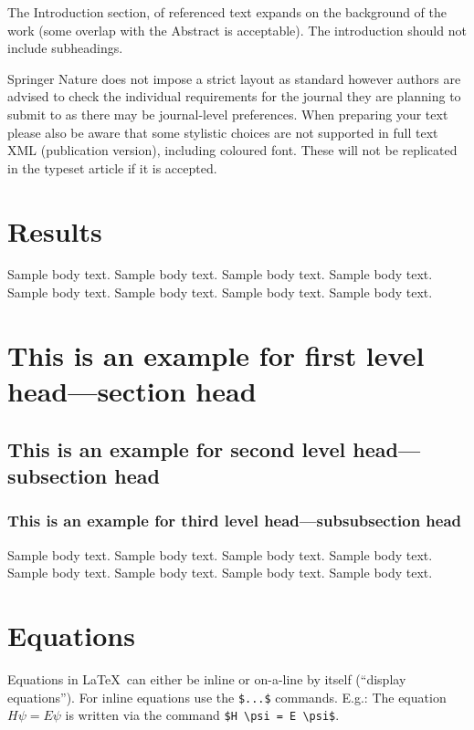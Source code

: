 \documentclass[pdflatex,sn-mathphys-num]{sn-jnl}%
\theoremstyle{thmstyleone}%
\theoremstyle{thmstyletwo}%
\theoremstyle{thmstylethree}%
\begin{document}
The Introduction section, of referenced text \cite{bib1} expands on the background of the work (some overlap with the Abstract is acceptable). The introduction should not include subheadings.

Springer Nature does not impose a strict layout as standard however authors are advised to check the individual requirements for the journal they are planning to submit to as there may be journal-level preferences. When preparing your text please also be aware that some stylistic choices are not supported in full text XML (publication version), including coloured font. These will not be replicated in the typeset article if it is accepted. 

\section{Results}\label{sec2}

Sample body text. Sample body text. Sample body text. Sample body text. Sample body text. Sample body text. Sample body text. Sample body text.

\section{This is an example for first level head---section head}\label{sec3}

\subsection{This is an example for second level head---subsection head}\label{subsec2}

\subsubsection{This is an example for third level head---subsubsection head}\label{subsubsec2}

Sample body text. Sample body text. Sample body text. Sample body text. Sample body text. Sample body text. Sample body text. Sample body text. 

\section{Equations}\label{sec4}

Equations in \LaTeX\ can either be inline or on-a-line by itself (``display equations''). For
inline equations use the \verb+$...$+ commands. E.g.: The equation
$H\psi = E \psi$ is written via the command \verb+$H \psi = E \psi$+.
\end{document}

